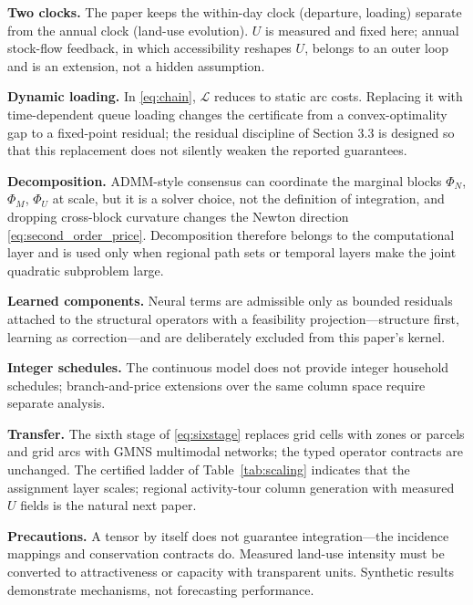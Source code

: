 \documentclass[10pt]{article}
\newcommand{\Load}{\mathcal{L}}
\begin{document}
\textbf{Two clocks.} The paper keeps the within-day clock (departure, loading) separate from the annual clock (land-use evolution). $U$ is measured and fixed here; annual stock-flow feedback, in which accessibility reshapes $U$, belongs to an outer loop and is an extension, not a hidden assumption.

\textbf{Dynamic loading.} In \eqref{eq:chain}, $\Load$ reduces to static arc costs. Replacing it with time-dependent queue loading changes the certificate from a convex-optimality gap to a fixed-point residual; the residual discipline of Section 3.3 is designed so that this replacement does not silently weaken the reported guarantees.

\textbf{Decomposition.} ADMM-style consensus \parencite{boyd2011} can coordinate the marginal blocks $\Phi_N$, $\Phi_M$, $\Phi_U$ at scale, but it is a solver choice, not the definition of integration, and dropping cross-block curvature changes the Newton direction \eqref{eq:second_order_price}. Decomposition therefore belongs to the computational layer and is used only when regional path sets or temporal layers make the joint quadratic subproblem large.

\textbf{Learned components.} Neural terms are admissible only as bounded residuals attached to the structural operators with a feasibility projection---structure first, learning as correction---and are deliberately excluded from this paper's kernel.

\textbf{Integer schedules.} The continuous model does not provide integer household schedules; branch-and-price extensions over the same column space require separate analysis.

\textbf{Transfer.} The sixth stage of \eqref{eq:sixstage} replaces grid cells with zones or parcels and grid arcs with GMNS multimodal networks; the typed operator contracts are unchanged. The certified ladder of Table~\ref{tab:scaling} indicates that the assignment layer scales; regional activity-tour column generation with measured $U$ fields is the natural next paper.

\textbf{Precautions.} A tensor by itself does not guarantee integration---the incidence mappings and conservation contracts do. Measured land-use intensity must be converted to attractiveness or capacity with transparent units. Synthetic results demonstrate mechanisms, not forecasting performance.

\end{document}
